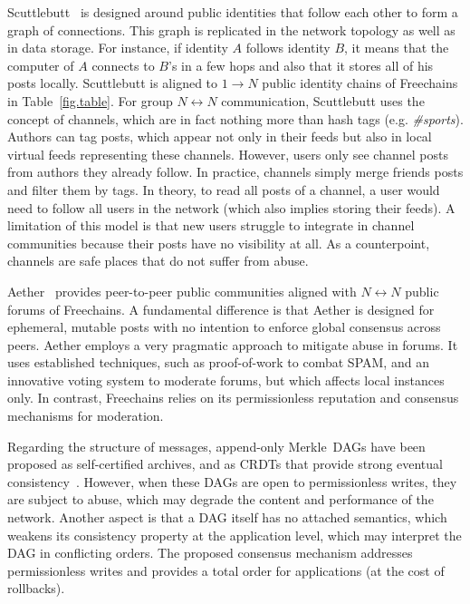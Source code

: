 \documentclass[10pt,journal,compsoc]{IEEEtran}
\newcommand{\FC}       {Freechains\xspace}
\newcommand{\Xon} {$1{\rightarrow}N$\xspace}
\newcommand{\Xnn} {$N{\leftrightarrow}N$\xspace}
\begin{document}
Scuttlebutt~\cite{p2p.scuttlebutt} is designed around public identities that
follow each other to form a graph of connections.
This graph is replicated in the network topology as well as in data storage.
For instance, if identity $A$ follows identity $B$, it means that the computer
of $A$ connects to $B$'s in a few hops and also that it stores all of his posts
locally.
Scuttlebutt is aligned to \Xon public identity chains of \FC in
Table~\ref{fig.table}.
%
For group \Xnn communication, Scuttlebutt uses the concept of channels, which
are in fact nothing more than hash tags (e.g. \emph{\#sports}).
Authors can tag posts, which appear not only in their feeds but also in local
virtual feeds representing these channels.
However, users only see channel posts from authors they already follow.
In practice, channels simply merge friends posts and filter them by tags.
In theory, to read all posts of a channel, a user would need to follow all
users in the network (which also implies storing their feeds).
A limitation of this model is that new users struggle to integrate in channel
communities because their posts have no visibility at all.
As a counterpoint, channels are safe places that do not suffer from abuse.
%

Aether~\cite{p2p.ecosystem} provides peer-to-peer public communities aligned
with \Xnn public forums of \FC.
A fundamental difference is that Aether is designed for ephemeral, mutable
posts with no intention to enforce global consensus across peers.
Aether employs a very pragmatic approach to mitigate abuse in forums.
It uses established techniques, such as proof-of-work to combat SPAM, and an
innovative voting system to moderate forums, but which affects local instances
only.
In contrast, \FC relies on its permissionless reputation and consensus
mechanisms for moderation.

Regarding the structure of messages, append-only Merkle~DAGs have been proposed
as self-certified archives, and as CRDTs that provide strong eventual
consistency~\cite{fed.matrix,p2p.byz}.
However, when these DAGs are open to permissionless writes, they are subject to
abuse, which may degrade the content and performance of the network.
Another aspect is that a DAG itself has no attached semantics, which weakens
its consistency property at the application level, which may interpret the DAG
in conflicting orders.
The proposed consensus mechanism addresses permissionless writes and provides
a total order for applications (at the cost of rollbacks).
\end{document}
